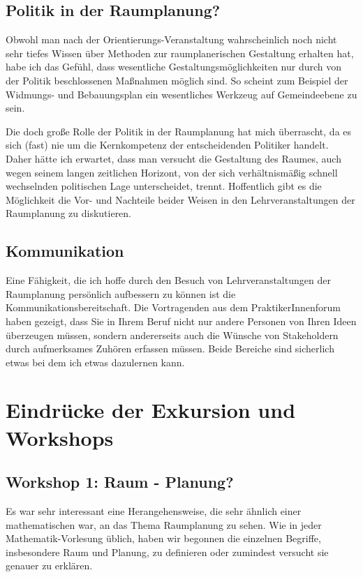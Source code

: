 \documentclass[]{article}
\begin{document}
\subsection{Politik in der Raumplanung?}
Obwohl man nach der Orientierungs-Veranstaltung wahrscheinlich noch nicht sehr tiefes Wissen über Methoden zur raumplanerischen Gestaltung erhalten hat, habe ich das Gefühl, dass wesentliche Gestaltungsmöglichkeiten nur durch von der Politik beschlossenen Maßnahmen möglich sind. So scheint zum Beispiel der Widmungs- und Bebauungsplan ein wesentliches Werkzeug auf Gemeindeebene zu sein.

Die doch große Rolle der Politik in der Raumplanung hat mich überrascht, da es sich (fast) nie um die Kernkompetenz der entscheidenden Politiker handelt. Daher hätte ich erwartet, dass man versucht die Gestaltung des Raumes, auch wegen seinem langen zeitlichen Horizont, von der sich verhältnismäßig schnell wechselnden politischen Lage unterscheidet, trennt. Hoffentlich gibt es die Möglichkeit die Vor- und Nachteile beider Weisen in den Lehrveranstaltungen der Raumplanung zu diskutieren.

\subsection{Kommunikation}
Eine Fähigkeit, die ich hoffe durch den Besuch von Lehrveranstaltungen der Raumplanung persönlich aufbessern zu können ist die Kommunikationsbereitschaft. Die Vortragenden aus dem PraktikerInnenforum haben gezeigt, dass Sie in Ihrem Beruf nicht nur andere Personen von Ihren Ideen überzeugen müssen, sondern andererseits auch die Wünsche von Stakeholdern durch aufmerksames Zuhören erfassen müssen. Beide Bereiche sind sicherlich etwas bei dem ich etwas dazulernen kann.

\section{Eindrücke der Exkursion und Workshops}
\subsection{Workshop 1: Raum - Planung?}
Es war sehr interessant eine Herangehensweise, die sehr ähnlich einer mathematischen war, an das Thema Raumplanung zu sehen. Wie in jeder Mathematik-Vorlesung üblich, haben wir begonnen die einzelnen Begriffe, insbesondere Raum und Planung, zu definieren oder zumindest versucht sie genauer zu erklären.
\end{document}
